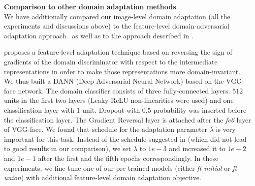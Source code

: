 

\bigskip\indent\textbf{Comparison to other domain adaptation methods}\\
\label{sect:grl}
We have additionally compared our image-level domain adaptation (all the experiments and discussions above) to the feature-level domain-adversarial adaptation approach~\citep{ganin2016domain} as well as to the approach described in \citep{SohnLZY0C17}.


\citep{ganin2016domain} proposes a feature-level adaptation technique based on reversing the sign of gradients of the domain discriminator with respect to the intermediate representations in order to make those representations more domain-invariant.  
We thus built a DANN (Deep Adversarial Neural Network) based on the VGG-face network. The  domain classifier consists of three fully-connected layers: $512$ units in the first two layers (Leaky ReLU \citep{HeZRS15} non-linearities were used) and one classification layer with $1$ unit. Dropout with $0.5$ probability was inserted before the classification layer. The Gradient Reversal layer is attached after the \textit{fc6} layer of VGG-face. We found that schedule for the adaptation parameter  $\lambda$ is very important for this task. Instead of the schedule suggested in \citep{ganin2016domain} (which did not lead to good results in our comparison), we set $\lambda$ to $1e-3$ and increased it to $1e-2$ and $1e-1$ after the first and the fifth epochs correspondingly. In these experiments,  we fine-tune one of our pre-trained models (either \textit{ft initial} or \textit{ft union}) with additional feature-level domain adaptation objective. 

